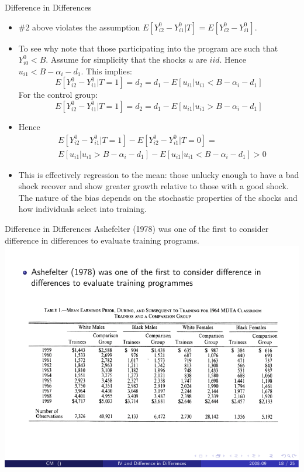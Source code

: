 \begin{frame}{Difference in Differences}
\begin{itemize}
\item  \#2 above violates the assumption {\small $E[Y_{i2}^0 - Y_{i1}^0 | T] = E[Y_{i2}^0 - Y_{i1}^0]$}. 
\item To see why note that those participating into the program are such
that {\small $Y_{i0}^0 < B$}. Assume for simplicity that the shocks {\small $u$} are {\small $iid$}. Hence {\small $u_{i1} < B- \alpha_i - d_1$}. 
This implies: 
{\small $$E[Y_{i2}^0 - Y_{i1}^0 | T=1] = d_2 = d_1 - E[u_{i1}| u_{i1} <  B-\alpha_i - d_1]$$}
For the control group:
{\small $$E[Y_{i2}^0 - Y_{i1}^0 | T=1] = d_2 = d_1 - E[u_{i1}| u_{i1} >  B-\alpha_i - d_1]$$}
\item Hence
\begin{align*}
& E[Y_{i2}^0 - Y_{i1}^0 | T=1] - E[Y_{i2}^0 - Y_{i1}^0 | T=0] =\\
&  E[u_{i1} | u_{i1} >  B-\alpha_i - d_1] - E[u_{i1} | u_{i1} < B-\alpha_i - d_1]  >0
  \end{align*}
 \item This is effectively regression to the mean: those unlucky enough to have a bad shock recover and show greater growth relative to those with a good shock. The nature of the bias depends on the stochastic properties of the shocks and how individuals select into training.
\end{itemize}
\end{frame} 

\begin{frame}{Difference in Differences}
Ashefelter (1978) was one of the first to consider difference in differences to evaluate training programs.
\includegraphics[scale=1]{./resources/ashefelter1.pdf}
\end{frame}

